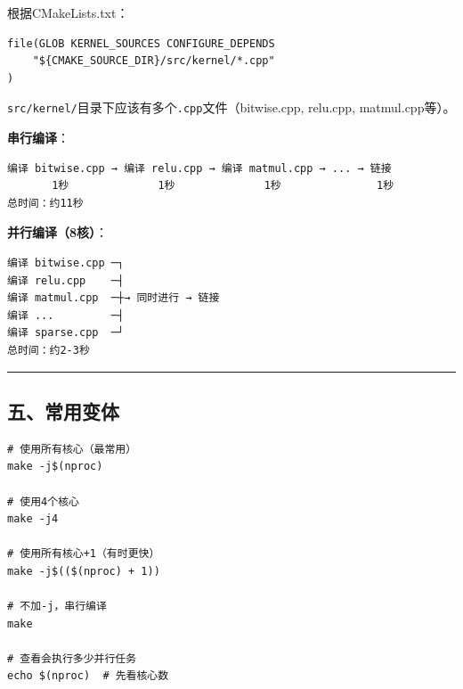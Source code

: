 \documentclass[11pt, a4paper]{article}
\begin{document}
\begin{aibox}
根据CMakeLists.txt：
\begin{tcolorbox}[colback=white,colframe=gray!50!white,boxrule=0.5pt,arc=2pt,left=5pt,right=5pt,top=5pt,bottom=5pt]
\begin{verbatim}
file(GLOB KERNEL_SOURCES CONFIGURE_DEPENDS
    "${CMAKE_SOURCE_DIR}/src/kernel/*.cpp"
)
\end{verbatim}
\end{tcolorbox}

\texttt{src/kernel/}目录下应该有多个\texttt{.cpp}文件（bitwise.cpp, relu.cpp, matmul.cpp等）。

\textbf{串行编译}：
\begin{tcolorbox}[colback=white,colframe=gray!50!white,boxrule=0.5pt,arc=2pt,left=5pt,right=5pt,top=5pt,bottom=5pt]
\begin{verbatim}
编译 bitwise.cpp → 编译 relu.cpp → 编译 matmul.cpp → ... → 链接
       1秒              1秒              1秒               1秒
总时间：约11秒
\end{verbatim}
\end{tcolorbox}

\textbf{并行编译（8核）}：
\begin{tcolorbox}[colback=white,colframe=gray!50!white,boxrule=0.5pt,arc=2pt,left=5pt,right=5pt,top=5pt,bottom=5pt]
\begin{verbatim}
编译 bitwise.cpp ─┐
编译 relu.cpp    ─┤
编译 matmul.cpp  ─┼→ 同时进行 → 链接
编译 ...         ─┤
编译 sparse.cpp  ─┘
总时间：约2-3秒
\end{verbatim}
\end{tcolorbox}

\begin{center}\rule{\textwidth}{0.4pt}\end{center}

\subsection*{五、常用变体}

\begin{tcolorbox}[colback=white,colframe=gray!50!white,boxrule=0.5pt,arc=2pt,left=5pt,right=5pt,top=5pt,bottom=5pt]
\begin{verbatim}
# 使用所有核心（最常用）
make -j$(nproc)

# 使用4个核心
make -j4

# 使用所有核心+1（有时更快）
make -j$(($(nproc) + 1))

# 不加-j，串行编译
make

# 查看会执行多少并行任务
echo $(nproc)  # 先看核心数
\end{verbatim}
\end{tcolorbox}


\end{aibox}
\end{document}
